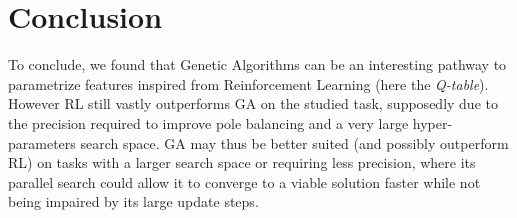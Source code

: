 \section{Conclusion}

To conclude, we found that Genetic Algorithms can be an interesting pathway to parametrize features inspired from Reinforcement Learning (here the \textit{Q-table}).
However RL still vastly outperforms GA on the studied task, supposedly due to the precision required to improve pole balancing and a very large hyper-parameters search space.
GA may thus be better suited (and possibly outperform RL) on tasks with a larger search space or requiring less precision, where its parallel search could allow it to converge to a viable solution faster while not being impaired by its large update steps.

